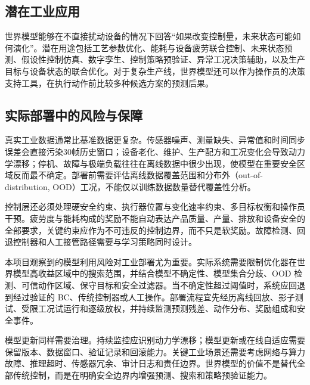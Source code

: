 \subsection{潜在工业应用}

世界模型能够在不直接扰动设备的情况下回答“如果改变控制量，未来状态可能如何演化”。潜在用途包括工艺参数优化、能耗与设备疲劳联合控制、未来状态预测、假设性控制仿真、数字孪生、控制策略预验证、异常工况决策辅助，以及生产目标与设备状态的联合优化。对于复杂生产线，世界模型还可以作为操作员的决策支持工具，在执行动作前比较多种候选方案的预测后果。

\subsection{实际部署中的风险与保障}

真实工业数据通常比基准数据更复杂。传感器噪声、测量缺失、异常值和时间同步误差会直接污染30帧历史窗口；设备老化、维护、生产配方和工况变化会导致动力学漂移；停机、故障与极端负载往往在离线数据中很少出现，使模型在重要安全区域反而最不确定。部署前需要评估离线数据覆盖范围和分布外（out-of-distribution, OOD）工况，不能仅以训练数据数量替代覆盖性分析。

控制层还必须处理硬安全约束、执行器位置与变化速率约束、多目标权衡和操作员干预。疲劳度与能耗构成的奖励不能自动表达产品质量、产量、排放和设备安全的全部要求，关键约束应作为不可违反的控制边界，而不只是软奖励。故障检测、回退控制器和人工接管路径需要与学习策略同时设计。

本项目观察到的模型利用风险对工业部署尤为重要。实际系统需要限制优化器在世界模型高收益区域中的搜索范围，并结合模型不确定性、模型集合分歧、OOD 检测、可信动作区域、保守目标和安全过滤器。当不确定性超过阈值时，系统应回退到经过验证的 BC、传统控制器或人工操作。部署流程宜先经历离线回放、影子测试、受限工况试运行和逐级放权，并持续监测预测残差、动作分布、奖励组成和安全事件。

模型更新同样需要治理。持续监控应识别动力学漂移；模型更新或在线自适应需要保留版本、数据窗口、验证记录和回滚能力。关键工业场景还需要考虑网络与算力故障、推理超时、传感器冗余、审计日志和责任边界。世界模型的价值不是替代全部传统控制，而是在明确安全边界内增强预测、搜索和策略预验证能力。
